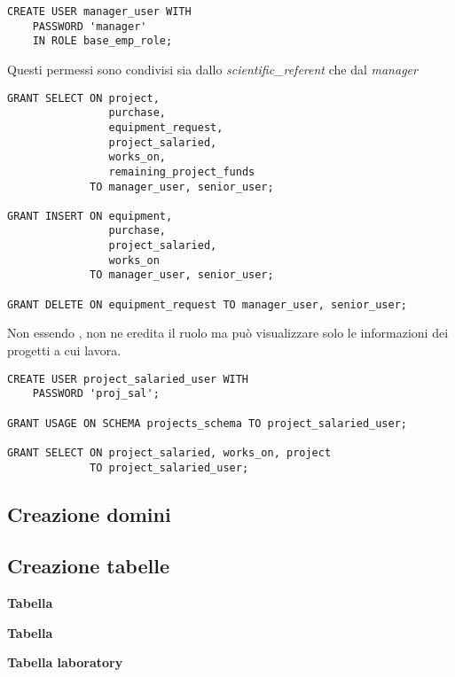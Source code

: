 \begin{lstlisting}
CREATE USER manager_user WITH
	PASSWORD 'manager'
	IN ROLE base_emp_role;	
\end{lstlisting}\medskip
Questi permessi sono condivisi sia dallo \textit{scientific\_referent} che dal \textit{manager}
\begin{lstlisting}
GRANT SELECT ON project,  
                purchase,  
                equipment_request,  
                project_salaried,  
                works_on, 
                remaining_project_funds 
             TO manager_user, senior_user;

GRANT INSERT ON equipment, 
                purchase, 
                project_salaried, 
                works_on 
             TO manager_user, senior_user;

GRANT DELETE ON equipment_request TO manager_user, senior_user;
\end{lstlisting}
Non essendo \textit{\baseemp}, non ne eredita il ruolo ma può visualizzare solo le informazioni dei progetti a cui lavora.
\begin{lstlisting}
CREATE USER project_salaried_user WITH
	PASSWORD 'proj_sal';

GRANT USAGE ON SCHEMA projects_schema TO project_salaried_user;

GRANT SELECT ON project_salaried, works_on, project
             TO project_salaried_user;
\end{lstlisting}

\subsection{Creazione domini}








\newpage
\subsection{Creazione tabelle}
\noindent \textbf{Tabella \baseemp}
\bigskip

\noindent \textbf{Tabella \careerlog}
\bigskip

\newpage
\noindent \textbf{Tabella laboratory}
\bigskip

